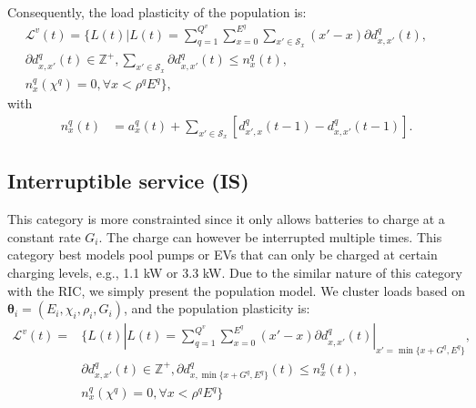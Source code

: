 \documentclass[10pt]{IEEEtran}
\begin{document}
Consequently, the load plasticity of the population is:
  \begin{eqnarray} \label{occur5} 
{\mathcal L}^v(t) = \Big\{L(t) |  L(t) = \sum_{q=1}^{Q^v}\sum_{x=0}^{E^q} \sum_{x'\in \mathcal S_x}(x'-x)\partial d^q_{x,x'}(t),  & & \nonumber\\ \partial d_{x,x'}^q(t) \in \mathbb{Z}^+,\!\!\sum_{x'\in \mathcal S_x}\partial d_{x,x'}^q(t)\leq n^q_x(t),\nonumber & & \\  n_x^q(\chi^q) = 0, \forall x < \rho^q E^q\Big\},~~~~~~~~~~~~~~~& & 
\end{eqnarray}
with
\begin{align}\label{nx}
n_{x}^q(t)&=  a^q_x(t) + \sum_{x'\in \mathcal S_x}[d^q_{x',x}(t-1)- d^q_{x,x'}(t-1)].
\end{align}

\subsection{Interruptible service (IS)}  \label{cat2}
This category is more constrainted since it only allows batteries to charge at a constant rate $G_i$. The charge can however be interrupted multiple times.
 This category best models pool pumps or EVs that can only be charged at certain charging levels, e.g., 1.1 kW or 3.3 kW. Due to the similar nature of this category with the RIC, we simply present the population model. We cluster loads based on $\boldsymbol{\theta}_i = (E_i, \chi_i, \rho_i, G_i)$, and the population plasticity is:
 \begin{align} {\mathcal L}^v(t) \!=\! &\Big\{L(t) |  L(t) \!= \!\sum_{q=1}^{Q^v}\sum_{x=0}^{E^q} \!(x'\!-\!x)\partial d^q_{x,x'}(t)|_{x'=\min\{x+G^q,E^q\}}, \nonumber  \\ 
&\partial d_{x,x'}^q(t) \in \mathbb{Z}^+, \partial d_{x,\min\{x+G^q,E^q\}}^q(t)\leq n^q_x(t),\nonumber \\ 
&  n_x^q(\chi^q) = 0, \forall x < \rho^q E^q\Big\} \label{occur6} 
\end{align}
\end{document}
